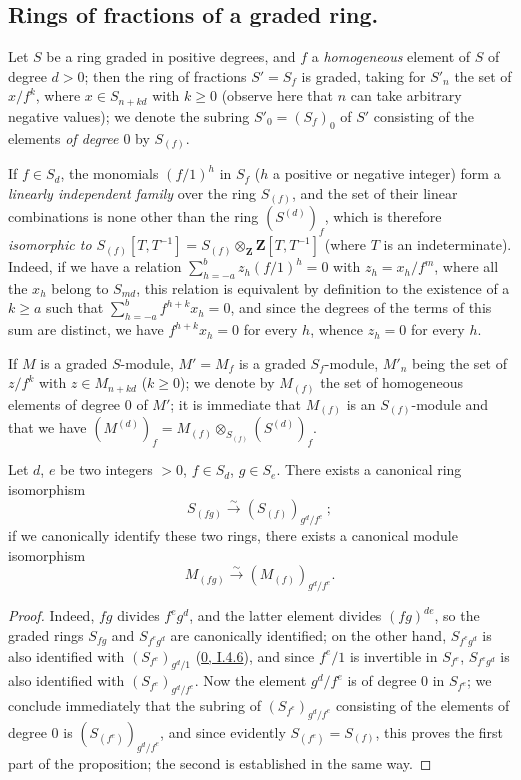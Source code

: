 \subsection{Rings of fractions of a graded ring.}
\label{subsection:II.2.2}

\begin{env}[2.2.1]
\label{II.2.2.1}
Let $S$ be a ring graded in positive degrees, and $f$ a
\emph{homogeneous} element of $S$ of degree $d>0$; then the ring of
fractions $S'=S_f$ is graded, taking for $S'_n$ the set of $x/f^k$, where
$x\in S_{n+kd}$ with $k\geq 0$ (observe here that $n$ can take arbitrary
negative values); we denote the subring $S'_0=(S_f)_0$ of $S'$
consisting of the elements \emph{of degree $0$} by
$S_{(f)}$.

If $f\in S_d$, the monomials $(f/1)^h$ in $S_f$ ($h$ a positive or
negative integer) form a \emph{linearly independent family} over the ring
$S_{(f)}$, and the set of their linear combinations is none other than
the ring $(S^{(d)})_f$, which is therefore \emph{isomorphic to
$S_{(f)}[T,T^{-1}]=S_{(f)}\otimes_{\mathbf{Z}}\mathbf{Z}[T,T^{-1}]$}
(where $T$ is an indeterminate). Indeed, if we have a relation
$\sum_{h=-a}^{b}z_h(f/1)^h=0$ with $z_h=x_h/f^m$, where all the $x_h$
belong to $S_{md}$, this relation is equivalent by definition to
the existence of a $k\geq a$ such that
$\sum_{h=-a}^{b}f^{h+k}x_h=0$, and since the degrees of the terms of this
sum are distinct, we have $f^{h+k}x_h=0$ for every $h$, whence $z_h=0$ for
every $h$.

If $M$ is a graded $S$-module, $M'=M_f$ is a graded $S_f$-module,
$M'_n$ being the set of $z/f^k$ with $z\in M_{n+kd}$ ($k\geq 0$); we
denote by $M_{(f)}$ the set of homogeneous elements of degree $0$ of
$M'$; it is immediate that $M_{(f)}$ is an $S_{(f)}$-module and that we have
$(M^{(d)})_f=M_{(f)}\otimes_{S_{(f)}}(S^{(d)})_f$.
\end{env}

\begin{lemma}[2.2.2]
\label{II.2.2.2}
Let $d$, $e$ be two integers $>0$, $f\in S_d$, $g\in S_e$. There exists a
canonical ring isomorphism
\[
  S_{(fg)}\xrightarrow{\sim}(S_{(f)})_{g^d/f^e}~;
\]
if we canonically identify these two rings, there exists a canonical module
isomorphism
\[
  M_{(fg)}\xrightarrow{\sim}(M_{(f)})_{g^d/f^e}.
\]
\end{lemma}

\begin{proof}
Indeed, $fg$ divides $f^e g^d$, and the latter element divides $(fg)^{de}$,
so the graded rings $S_{fg}$ and $S_{f^e g^d}$ are canonically
identified; on the other hand, $S_{f^e g^d}$ is also identified with
$(S_{f^e})_{g^d/1}$ (\hyperref[0.1.4.6]{0, I.4.6}), and since $f^e/1$ is
invertible in $S_{f^e}$, $S_{f^e g^d}$ is also identified with
$(S_{f^e})_{g^d/f^e}$. Now the element $g^d/f^e$ is of degree $0$ in
$S_{f^e}$; we conclude immediately that the subring of
$(S_{f^e})_{g^d/f^e}$ consisting of the elements of degree $0$ is
$(S_{(f^e)})_{g^d/f^e}$, and since evidently
$S_{(f^e)}=S_{(f)}$, this proves the first part of the proposition;
the second is established in the same way.
\end{proof}

